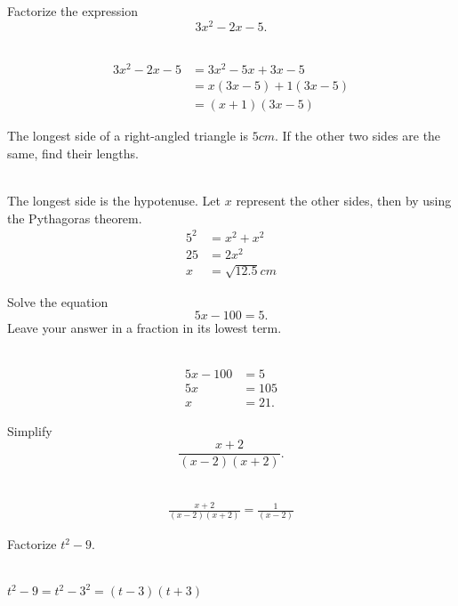 \documentclass[addpoints,12pt]{exam}
\begin{document}
\begin{questions}
 \question Factorize the expression $$3x^2-2x-5.$$
	\ifprintanswers
	  \begin{solution}\\
		\begin{align*}
		  3x^2-2x-5 &= 3x^2-5x+3x-5 \\
		  &= x(3x -5)+1(3x-5) \\
		  &= (x+1)(3x-5)
		\end{align*}

	  \end{solution}
	\else
	  \makeemptybox{1.33in}
	\fi
	
 \question The longest side of a right-angled triangle is $5cm$. If the other two sides 
are the same, find their lengths.
	\ifprintanswers
	  \begin{solution}\\
		The longest side is the hypotenuse. Let $x$ represent the other sides, then by using the 
Pythagoras theorem.
		\begin{align*}
		  5^2 &= x^2 + x^2 \\
		  25 &= 2x^2 \\
		  x &= \sqrt{12.5}cm
		\end{align*}
	  \end{solution}
	\else
	  \makeemptybox{1.33in}
	\fi
	
 \question Solve the equation $$5x-100=5.$$ Leave your answer in a fraction in its lowest term.
	\ifprintanswers
	  \begin{solution}\\
		\begin{align*}
		  5x-100 &= 5 \\
		  5x &= 105 \\
		  x &= 21.
		\end{align*}
	  \end{solution}
	\else
	  \makeemptybox{1.33in}
	\fi
	
 \question Simplify $$\frac{x+2}{(x-2)(x+2)}.$$
	\ifprintanswers
	  \begin{solution}\\
		\begin{align*}
		  \frac{x+2}{(x-2)(x+2)} = \frac{1}{(x-2)}
		\end{align*}

	  \end{solution}
	\else
	  \makeemptybox{1.33in}
	\fi
	
 \question Factorize $t^2 - 9$.
	\ifprintanswers
	  \begin{solution}\\
		$t^2 - 9=t^2 - 3^2=(t-3)(t+3)$
	  \end{solution}
	\else
	  \makeemptybox{1.33in}
	\fi
	

\end{questions}
\end{document}
